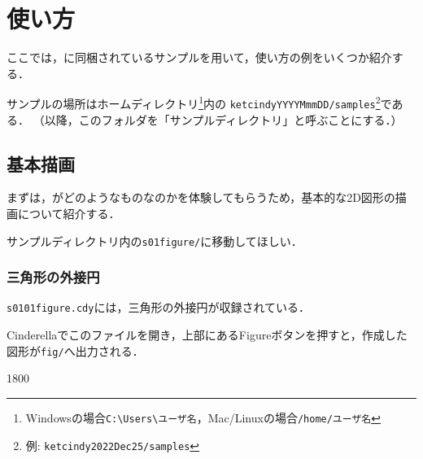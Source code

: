 
\chapter{使い方}

ここでは，{\ketcindy}に同梱されているサンプルを用いて，使い方の例をいくつか紹介する．

サンプルの場所はホームディレクトリ\footnote{Windowsの場合\verb|C:\Users\ユーザ名|，Mac/Linuxの場合\verb|/home/ユーザ名|}内の
\verb|ketcindyYYYYMmmDD/samples|\footnote{例: \verb|ketcindy2022Dec25/samples|}である．
（以降，このフォルダを「サンプルディレクトリ」と呼ぶことにする．）

\section{基本描画}
まずは，{\ketcindy}がどのようなものなのかを体験してもらうため，基本的な2D図形の描画について紹介する．

サンプルディレクトリ内の\verb|s01figure/|に移動してほしい．

\subsection{三角形の外接円}
\verb|s0101figure.cdy|には，三角形の外接円が収録されている．

Cinderellaでこのファイルを開き，上部にあるFigureボタンを押すと，作成した図形が\verb|fig/|へ出力される．


\begin{layer}{180}{0}
\end{layer}

